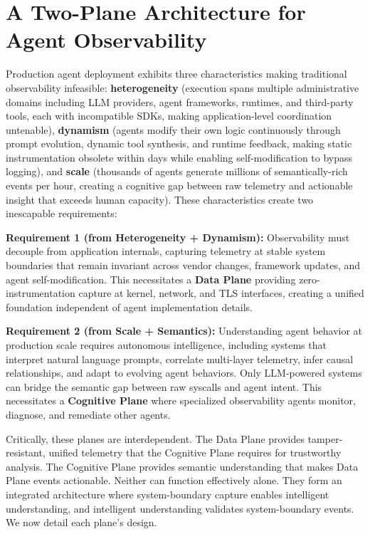 \documentclass[sigplan,screen,9pt]{acmart}
\begin{document}
\section{A Two-Plane Architecture for Agent Observability}

Production agent deployment exhibits three characteristics making traditional observability infeasible: \textbf{heterogeneity} (execution spans multiple administrative domains including LLM providers, agent frameworks, runtimes, and third-party tools, each with incompatible SDKs, making application-level coordination untenable), \textbf{dynamism} (agents modify their own logic continuously through prompt evolution, dynamic tool synthesis, and runtime feedback, making static instrumentation obsolete within days while enabling self-modification to bypass logging), and \textbf{scale} (thousands of agents generate millions of semantically-rich events per hour, creating a cognitive gap between raw telemetry and actionable insight that exceeds human capacity). These characteristics create two inescapable requirements:

\textbf{Requirement 1 (from Heterogeneity + Dynamism):} Observability must decouple from application internals, capturing telemetry at stable system boundaries that remain invariant across vendor changes, framework updates, and agent self-modification. This necessitates a \textbf{Data Plane} providing zero-instrumentation capture at kernel, network, and TLS interfaces, creating a unified foundation independent of agent implementation details.

\textbf{Requirement 2 (from Scale + Semantics):} Understanding agent behavior at production scale requires autonomous intelligence, including systems that interpret natural language prompts, correlate multi-layer telemetry, infer causal relationships, and adapt to evolving agent behaviors. Only LLM-powered systems can bridge the semantic gap between raw syscalls and agent intent. This necessitates a \textbf{Cognitive Plane} where specialized observability agents monitor, diagnose, and remediate other agents.

Critically, these planes are interdependent. The Data Plane provides tamper-resistant, unified telemetry that the Cognitive Plane requires for trustworthy analysis. The Cognitive Plane provides semantic understanding that makes Data Plane events actionable. Neither can function effectively alone. They form an integrated architecture where system-boundary capture enables intelligent understanding, and intelligent understanding validates system-boundary events. We now detail each plane's design.
\end{document}
